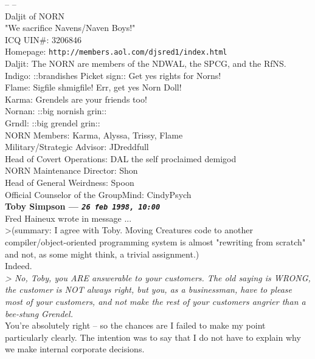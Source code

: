\documentclass[11pt,twoside,a4paper]{article}
\begin{document}
\begin{multicols*}{2}
-- -- ~\\
Daljit of NORN~\\
"We sacrifice Navens/Naven Boys!"~\\
ICQ UIN\#:  3206846~\\
Homepage:  \texttt{http://members.aol.com/djsred1/index.html}~\\

Daljit:  The NORN are members of the NDWAL, the SPCG, and the RfNS.~\\
Indigo:  ::brandishes Picket sign::  Get yes rights for Norns!~\\
Flame:  Sigfile shmigfile!  Err, get yes Norn Doll!~\\
Karma:  Grendels are your friends too!~\\
Nornan:  ::big nornish grin::~\\
Grndl:  ::big grendel grin::~\\

NORN Members:  Karma, Alyssa, Trissy, Flame~\\
Military/Strategic Advisor:  JDreddfull~\\
Head of Covert Operations:  DAL the self proclaimed demigod~\\
NORN Maintenance Director:  Shon~\\
Head of General Weirdness:  Spoon~\\
Official Counselor of the GroupMind:  CindyPsych~\\

 
		
	
		
\textbf{Toby Simpson --- \emph{\texttt{26 feb 1998, 10:00}}}~\\

Fred Haineux wrote in message ...~\\
>(summary: I agree with Toby. Moving Creatures code to another compiler/object-oriented programming system is almost "rewriting from scratch" and not, as some might think, a trivial assignment.)~\\

Indeed.~\\

\emph{> No, Toby, you ARE answerable to your customers. The old saying is WRONG, the customer is NOT always right, but you, as a businessman, have to please most of your customers, and not make the rest of your customers angrier than a bee-stung Grendel.}~\\

You're absolutely right -- so the chances are I failed to make my point particularly clearly. The intention was to say that I do not have to explain why we make internal corporate decisions.~\\


\end{multicols*}
\end{document}

